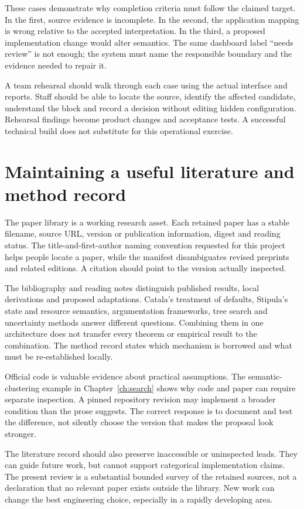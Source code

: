 \documentclass[12pt,a4paper,oneside,openany]{book}
\begin{document}
These cases demonstrate why completion criteria must follow the claimed target.
In the first, source evidence is incomplete. In the second, the application mapping
is wrong relative to the accepted interpretation. In the third, a proposed
implementation change would alter semantics. The same dashboard label ``needs
review'' is not enough; the system must name the responsible boundary and the
evidence needed to repair it.

A team rehearsal should walk through each case using the actual interface and
reports. Staff should be able to locate the source, identify the affected
candidate, understand the block and record a decision without editing hidden
configuration. Rehearsal findings become product changes and acceptance tests.
A successful technical build does not substitute for this operational exercise.

\section{Maintaining a useful literature and method record}

The paper library is a working research asset. Each retained paper has a stable
filename, source URL, version or publication information, digest and reading
status. The title-and-first-author naming convention requested for this project
helps people locate a paper, while the manifest disambiguates revised preprints
and related editions. A citation should point to the version actually inspected.

The bibliography and reading notes distinguish published results, local
derivations and proposed adaptations. Catala's treatment of defaults, Stipula's
state and resource semantics, argumentation frameworks, tree search and uncertainty
methods answer different questions. Combining them in one architecture does not
transfer every theorem or empirical result to the combination. The method record
states which mechanism is borrowed and what must be re-established locally.

Official code is valuable evidence about practical assumptions. The semantic-
clustering example in Chapter~\ref{ch:search} shows why code and paper can require
separate inspection. A pinned repository revision may implement a broader
condition than the prose suggests. The correct response is to document and test
the difference, not silently choose the version that makes the proposal look
stronger.

The literature record should also preserve inaccessible or uninspected leads.
They can guide future work, but cannot support categorical implementation claims.
The present review is a substantial bounded survey of the retained sources,
not a declaration that no relevant paper exists outside the library. New work can
change the best engineering choice, especially in a rapidly developing area.
\end{document}
